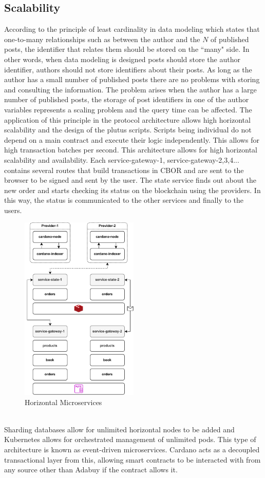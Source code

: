 \documentclass[12pt]{article}
\begin{document}
\subsection { Scalability } 

According to the principle of least cardinality in data modeling which states that one-to-many relationships such as between the author and the $N$ of published posts, the identifier that relates them should be stored on the ``many" side. In other words, when data modeling is designed posts should store the author identifier, authors should not store identifiers about their posts. As long as the author has a small number of published posts there are no problems with storing and consulting the information. The problem arises when the author has a large number of published posts, the storage of post identifiers in one of the author variables represents a scaling problem and the query time can be affected.
The application of this principle in the protocol architecture allows high horizontal scalability and the design of the plutus scripts. Scripts being individual do not depend on a main contract and execute their logic independently. This allows for high transaction batches per second. This architecture allows for high horizontal scalability and availability. Each service-gateway-1, service-gateway-2,3,4... contains several routes that build transactions in CBOR and are sent to the browser to be signed and sent by the user. The state service finds out about the new order and starts checking its status on the blockchain using the providers. In this way, the status is communicated to the other services and finally to the users.
\begin{figure}[ht]
  \centering
  \includegraphics[width=0.5\textwidth]{horizontal.drawio.pdf}
  \caption{Horizontal Microservices}
  \label{fig:microservices}
\end{figure}
\\
Sharding databases allow for unlimited horizontal nodes to be added and Kubernetes allows for orchestrated management of unlimited pods. This type of architecture is known as event-driven microservices. Cardano acts as a decoupled transactional layer from this, allowing smart contracts to be interacted with from any source other than Adabuy if the contract allows it.
\end{document}
